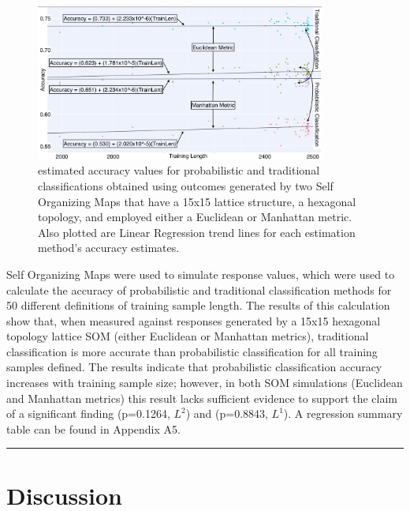 \documentclass[12pt,]{article}
\begin{document}
\begin{figure}[h!]
\begin{center}
\includegraphics[width=0.85\textwidth]{SomResultsGraph.jpeg}
\end{center}
\caption[Self Organizing Maps Result Plot]{estimated accuracy values for probabilistic and traditional classifications obtained using outcomes generated by two Self Organizing Maps that have a 15x15 lattice structure, a hexagonal topology, and employed either a Euclidean or Manhattan metric.  Also plotted are Linear Regression trend lines for each estimation method's accuracy estimates.}
\end{figure}

Self Organizing Maps were used to simulate response values, which were
used to calculate the accuracy of probabilistic and traditional
classification methods for 50 different definitions of training sample
length. The results of this calculation show that, when measured against
responses generated by a 15x15 hexagonal topology lattice SOM (either
Euclidean or Manhattan metrics), traditional classification is more
accurate than probabilistic classification for all training samples
defined. The results indicate that probabilistic classification accuracy
increases with training sample size; however, in both SOM simulations
(Euclidean and Manhattan metrics) this result lacks sufficient evidence
to support the claim of a significant finding (p=0.1264, \(L^{2}\)) and
(p=0.8843, \(L^{1}\)). A regression summary table can be found in
Appendix A5.

\begin{center}\rule{0.5\linewidth}{\linethickness}\end{center}

\newpage

\hypertarget{discussion}{%
\section{Discussion}\label{discussion}}
\end{document}
